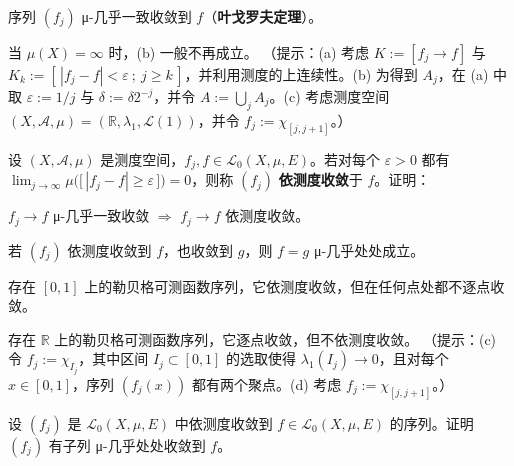 \begin{exercises}
\begin{items}
\item

序列 $ (f_j) $ μ-几乎一致收敛到 $ f $（\textbf{叶戈罗夫定理}）。

\item

当 $ \mu(X)=\infty $ 时，(b) 一般不再成立。
（提示：(a) 考虑 $ K := [f_j \to f] $ 与 $ K_k := [\,|f_j-f|<\varepsilon \ ;\ j \ge k\,] $，并利用测度的上连续性。(b) 为得到 $ A_j $，在 (a) 中取 $ \varepsilon := 1/j $ 与 $ \delta := \delta 2^{-j} $，并令 $ A := \bigcup_j A_j $。(c) 考虑测度空间 $ (X,\mathcal{A},\mu) = (\mathbb{R},\lambda_1,\mathcal{L}(1)) $，并令 $ f_j := \chi_{[j,j+1]} $。）

\end{items}

\item

设 $ (X,\mathcal{A},\mu) $ 是测度空间，$ f_j, f \in \mathcal{L}_0(X,\mu,E) $。若对每个 $ \varepsilon>0 $ 都有 $ \lim_{j\to\infty} \mu\big(\big[\,|f_j-f|\ge\varepsilon\,\big]\big)=0 $，则称 $ (f_j) $ \textbf{依测度收敛}于 $ f $。证明：

\begin{items}
\item

$ f_j \to f $ μ-几乎一致收敛 $ \Rightarrow $ $ f_j \to f $ 依测度收敛。

\item

若 $ (f_j) $ 依测度收敛到 $ f $，也收敛到 $ g $，则 $ f=g $ μ-几乎处处成立。

\item

存在 $ [0,1] $ 上的勒贝格可测函数序列，它依测度收敛，但在任何点处都不逐点收敛。

\item

存在 $ \mathbb{R} $ 上的勒贝格可测函数序列，它逐点收敛，但不依测度收敛。
（提示：(c) 令 $ f_j := \chi_{I_j} $，其中区间 $ I_j \subset [0,1] $ 的选取使得 $ \lambda_1(I_j) \to 0 $，且对每个 $ x \in [0,1] $，序列 $ (f_j(x)) $ 都有两个聚点。(d) 考虑 $ f_j := \chi_{[j,j+1]} $。）

\end{items}

\item

设 $ (f_j) $ 是 $ \mathcal{L}_0(X,\mu,E) $ 中依测度收敛到 $ f \in \mathcal{L}_0(X,\mu,E) $ 的序列。证明 $ (f_j) $ 有子列 μ-几乎处处收敛到 $ f $。


\end{exercises}
